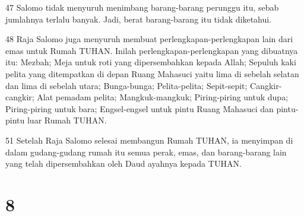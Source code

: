 \par 47 Salomo tidak menyuruh menimbang barang-barang perunggu itu, sebab jumlahnya terlalu banyak. Jadi, berat barang-barang itu tidak diketahui.
\par 48 Raja Salomo juga menyuruh membuat perlengkapan-perlengkapan lain dari emas untuk Rumah TUHAN. Inilah perlengkapan-perlengkapan yang dibuatnya itu: Mezbah; Meja untuk roti yang dipersembahkan kepada Allah; Sepuluh kaki pelita yang ditempatkan di depan Ruang Mahasuci yaitu lima di sebelah selatan dan lima di sebelah utara; Bunga-bunga; Pelita-pelita; Sepit-sepit; Cangkir-cangkir; Alat pemadam pelita; Mangkuk-mangkuk; Piring-piring untuk dupa; Piring-piring untuk bara; Engsel-engsel untuk pintu Ruang Mahasuci dan pintu-pintu luar Rumah TUHAN.
\par 51 Setelah Raja Salomo selesai membangun Rumah TUHAN, ia menyimpan di dalam gudang-gudang rumah itu semua perak, emas, dan barang-barang lain yang telah dipersembahkan oleh Daud ayahnya kepada TUHAN.

\chapter{8}

